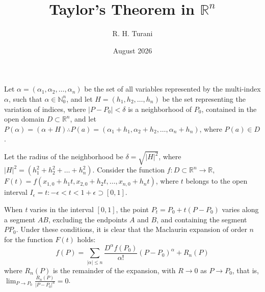 \documentclass[letterpaper]{article}
\title{Taylor's Theorem in $\mathbb{R}^n$}
\author{R. H. Turani}
\date{August 2026}
\begin{document}
\maketitle
Let $\alpha = (\alpha_1, \alpha_2, \ldots, \alpha_n)$ be the set of all variables represented by the multi-index $\alpha$,
such that $\alpha \in \mathbb{N}_0^n$, and let $H = (h_1, h_2, \ldots, h_n)$ be the set representing the variation of indices,
where $|P-P_0|<\delta$ is a neighborhood of $P_0$, contained in the open domain $D \subset \mathbb{R}^n$, and let 
$P(\alpha) = (\alpha + H) \therefore P(a) = (\alpha_1 + h_1, \alpha_2 + h_2, \ldots, \alpha_n + h_n)$, where $P(a) \in D$.

Let the radius of the neighborhood be $\delta = \sqrt{|H|^2}$, where $|H|^2 = (h_1^2 + h_2^2 + \ldots + h_n^2)$. Consider the function
$f: D \subset \mathbb{R}^n \to \mathbb{R}$, $F(t) = f(x_{1,0}+h_1t, x_{2,0}+h_2t, \ldots, x_{n,0}+h_nt)$, where $t$ belongs to the open interval
$I_\epsilon = {t: -\epsilon < t < 1+\epsilon}\supset[0,1]$.

When \textit{t} varies in the interval $[0,1]$, the point $P_t=P_0 + t(P-P_0)$ varies along a segment $AB$, excluding the endpoints $A$ and $B$, and containing the 
segment $PP_0$. Under these conditions, it is clear that the Maclaurin expansion of order $n$ for the function $F(t)$ holds:
\begin{equation}
 f(P) = \sum_{|\alpha| \leq n} \frac{D^\alpha f(P_0)}{\alpha!} (P-P_0)^\alpha + R_n(P)
\end{equation}
where $R_n(P)$ is the remainder of the expansion, with $R \rightarrow 0$ as $P \rightarrow P_0$, that is, $\lim_{P \to P_0} \frac{R_n(P)}{|P-P_0|^n} = 0$.
\end{document}
